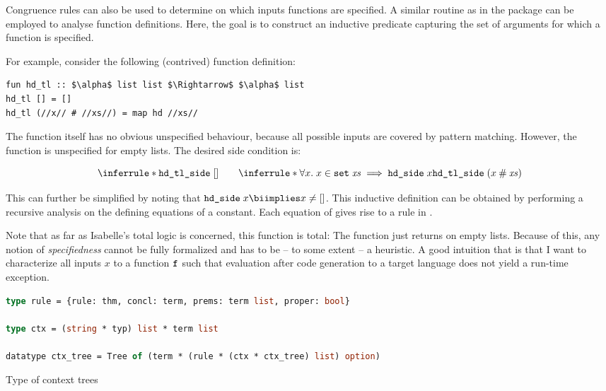 Congruence rules can also be used to determine on which inputs functions are specified.
A similar routine as in the  package can be employed to analyse function definitions.
Here, the goal is to construct an inductive predicate capturing the set of arguments for which a function is specified.

For example, consider the following (contrived) function definition:
\begin{lstlisting}[language=Isabelle]
fun hd_tl :: $\alpha$ list list $\Rightarrow$ $\alpha$ list
hd_tl [] = []
hd_tl (//x// # //xs//) = map hd //xs//
\end{lstlisting}

\noindent
The function itself has no obvious unspecified behaviour, because all possible inputs are covered by pattern matching.
However, the function  is unspecified for empty lists.
The desired side condition is:

\[
  \inferrule*{
  }{\holconst{hd\_tl\_side}\;[]}\qquad
  \inferrule*{
    \forall x.\;x \in \holconst{set}\;\mathit{xs} \implies \holconst{hd\_side}\;x
  }{\holconst{hd\_tl\_side}\;(x \cons \mathit{xs})}
\]

\noindent
This can further be simplified by noting that $\holconst{hd\_side}\;x \biimplies x \neq []$.
This inductive definition can be obtained by performing a recursive analysis on the defining equations of a constant.
Each equation of  gives rise to a rule in .

Note that as far as Isabelle's total logic is concerned, this function is total:
The  function just returns  on empty lists.
Because of this, any notion of \emph{specifiedness} cannot be fully formalized and has to be -- to some extent -- a heuristic.
A good intuition that is that I want to characterize all inputs $x$ to a function $\texttt{\textup{f}}$ such that evaluation after code generation to a target language does not yield a run-time exception.

\begin{code}[t]
  \begin{lstlisting}[language=ML]
type rule = {rule: thm, concl: term, prems: term list, proper: bool}

type ctx = (string * typ) list * term list

datatype ctx_tree = Tree of (term * (rule * (ctx * ctx_tree) list) option)
  \end{lstlisting}
  \caption{Type of context trees}
  \label{code:preproc:ctxtree}
\end{code}

